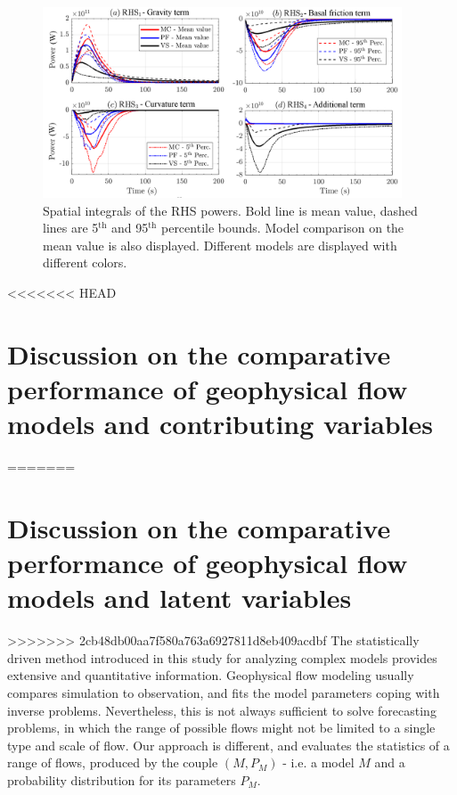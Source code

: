 \documentclass{article}
\begin{document}
\begin{figure}[H]
        \centering
        \includegraphics[width=0.95\textwidth]{figures/Colima/PowersColima.png}
        \caption{Spatial integrals of the RHS powers. Bold line is mean value, dashed lines are 5$^{\mathrm{th}}$ and 95$^{\mathrm{th}}$ percentile bounds. Model comparison on the mean value is also displayed. Different models are displayed with different colors.}
        \label{fig:Colima-Power-spatial}
\end{figure}


<<<<<<< HEAD
\section{Discussion on the comparative performance of geophysical flow models and contributing variables}

=======
\section{Discussion on the comparative performance of geophysical flow models and latent variables}
>>>>>>> 2cb48db00aa7f580a763a6927811d8eb409acdbf
The statistically driven method introduced in this study for analyzing complex models provides extensive and quantitative information. Geophysical flow modeling usually compares simulation to observation, and fits the model parameters coping with inverse problems. Nevertheless, this is not always sufficient to solve forecasting problems, in which the range of possible flows might not be limited to a single type and scale of flow. Our approach is different, and evaluates the statistics of a range of flows, produced by the couple $\left(M, P_M\right)$ - i.e. a model $M$ and a probability distribution for its parameters $P_M$.
\end{document}

